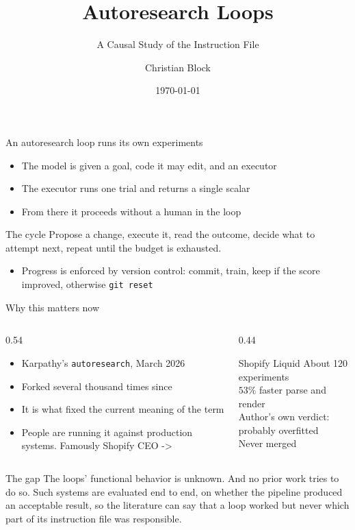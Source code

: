 \documentclass[aspectratio=169,11pt]{beamer}
\title[Autoresearch Loops]{Autoresearch Loops}
\subtitle{A Causal Study of the Instruction File}
\author[C.\ Block]{Christian Block}
\institute[]{Research project with Prof.\ Ramesh}
\date{\today}                     %
\begin{document}
\begin{frame}[plain]
  \titlepage
\end{frame}


\begin{frame}{An autoresearch loop runs its own experiments}
  \begin{itemize}
    \item The model is given a goal, code it may edit, and an executor
    \item The executor runs one trial and returns a single scalar
    \item From there it proceeds without a human in the loop
  \end{itemize}
  \vfill
  \begin{block}{The cycle}
    Propose a change, execute it, read the outcome, decide what to attempt
    next, repeat until the budget is exhausted.
  \end{block}
  \vfill
  \begin{itemize}
    \item Progress is enforced by version control: commit, train, keep if the
          score improved, otherwise \texttt{git reset}
  \end{itemize}
\end{frame}

\begin{frame}{Why this matters now}
  \begin{columns}[T]
    \begin{column}{0.54\textwidth}
      \begin{itemize}
        \item Karpathy's \texttt{autoresearch}, March 2026
        \item Forked several thousand times since
        \item It is what fixed the current meaning of the term
        \item People are running it against production systems. Famously Shopify CEO -> 
      \end{itemize}
    \end{column}
    \begin{column}{0.44\textwidth}
      \begin{block}{Shopify Liquid}
        \small
        About 120 experiments\\
        $53\%$ faster parse and render\\
        Author's own verdict: probably overfitted\\
        Never merged
      \end{block}
    \end{column}
  \end{columns}
  \vfill
  \begin{alertblock}{The gap}
    The loops' functional behavior is unknown. And no prior work tries to do so. Such systems are evaluated end to end, on whether the pipeline
    produced an acceptable result, so the literature can say that a loop
    worked but never which part of its instruction file was responsible.
  \end{alertblock}
\end{frame}
\end{document}

